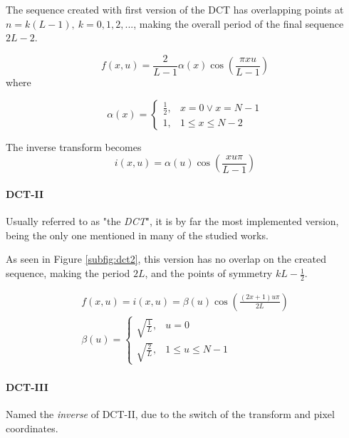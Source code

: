 The sequence created with first version of the DCT has overlapping points at $n = k(L-1) ,\ k = 0,1,2,...$, making the overall period of the final sequence $2L-2$.

\begin{equation}
    f(x,u) = \frac{2}{L-1}\alpha(x)\cos\left(\frac{\pi xu}{L-1}\right)
\end{equation}
where

\begin{equation}
    \alpha(x)= \begin{cases}
                    \frac{1}{2}, & x=0 \lor x = N-1 \\
                    1, & 1 \leq x \leq N-2
                \end{cases}
\end{equation}

The inverse transform becomes
\begin{equation}
    i(x,u) = \alpha(u)\cos\left(\frac{xu\pi}{L-1}\right)
\end{equation}

\paragraph{DCT-II}

Usually referred to as "the \emph{DCT}", it is by far the most implemented version, being the only one mentioned in many of the studied works.

As seen in Figure \ref{subfig:dct2}, this version has no overlap on the created sequence, making the period $2L$, and the points of symmetry $kL - \frac{1}{2}$.

\begin{gather} \label{eq:DCT2}
    f(x,u) = i(x,u) = \beta(u)\cos\left(\frac{(2x+1)u\pi }{2L}\right) \\
    \beta(u)= \begin{cases}
                    \sqrt{\frac{1}{L}}, & u=0 \\
                    \sqrt{\frac{2}{L}}, & 1 \leq u \leq N-1
                \end{cases}
\end{gather}

\paragraph{DCT-III}
Named the \emph{inverse} of DCT-II, due to the switch of the transform and pixel coordinates.


